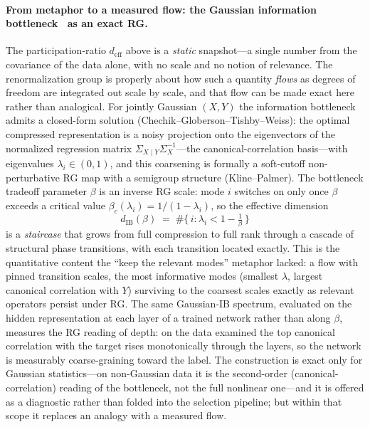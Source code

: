 \documentclass[11pt]{article}
\theoremstyle{definition}
\begin{document}
\paragraph{From metaphor to a measured flow: the Gaussian information bottleneck~\cite{tishby1999ib,tishby2015ib} as an exact RG.} The
participation-ratio $d_{\mathrm{eff}}$ above is a \emph{static} snapshot---a single number from the covariance
of the data alone, with no scale and no notion of relevance. The renormalization group is properly about how
such a quantity \emph{flows} as degrees of freedom are integrated out scale by scale, and that flow can be made
exact here rather than analogical. For jointly Gaussian $(X,Y)$ the information bottleneck admits a closed-form
solution (Chechik--Globerson--Tishby--Weiss): the optimal compressed representation is a noisy projection onto
the eigenvectors of the normalized regression matrix $\Sigma_{X\mid Y}\Sigma_X^{-1}$---the canonical-correlation
basis---with eigenvalues $\lambda_i\in(0,1)$, and this coarsening is formally a soft-cutoff non-perturbative RG
map with a semigroup structure (Kline--Palmer). The bottleneck tradeoff parameter $\beta$ is an inverse RG
scale: mode $i$ switches on only once $\beta$ exceeds a critical value $\beta_c(\lambda_i)=1/(1-\lambda_i)$, so
the effective dimension
\begin{equation}
d_{\mathrm{IB}}(\beta)\;=\;\#\{\,i:\lambda_i<1-\tfrac{1}{\beta}\,\}
\end{equation}
is a \emph{staircase} that grows from full compression to full rank through a cascade of structural phase
transitions, with each transition located exactly. This is the quantitative content the ``keep the relevant
modes'' metaphor lacked: a flow with pinned transition scales, the most informative modes (smallest $\lambda$,
largest canonical correlation with $Y$) surviving to the coarsest scales exactly as relevant operators persist
under RG. The same Gaussian-IB spectrum, evaluated on the hidden representation at each layer of a trained
network rather than along $\beta$, measures the RG reading of depth: on the data examined the top canonical
correlation with the target rises monotonically through the layers, so the network is measurably coarse-graining
toward the label. The construction is exact only for Gaussian statistics---on non-Gaussian data it is the
second-order (canonical-correlation) reading of the bottleneck, not the full nonlinear one---and it is offered
as a diagnostic rather than folded into the selection pipeline; but within that scope it replaces an analogy
with a measured flow.
\end{document}
